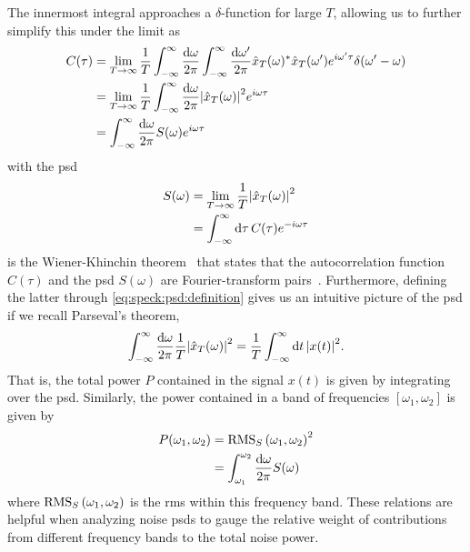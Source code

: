 The innermost integral approaches a $\delta$-function for large $T$,
allowing us to further simplify this under the limit as
\begin{align}
    C(\tau) &= \lim_{T\to\infty} \frac{1}{T}\int_{-\infty}^{\infty}\frac{\dd{\omega}}{2\pi}\int_{-\infty}^{\infty}\frac{\dd{\omega^\prime}}{2\pi}
                \hat{x}_T(\omega)^\ast\hat{x}_T(\omega^\prime)
                e^{i\omega^\prime\tau}\delta(\omega^\prime - \omega)\\
            &= \lim_{T\to\infty}\frac{1}{T}
                \int_{-\infty}^{\infty}\frac{\dd{\omega}}{2\pi}\abs{\hat{x}_T(\omega)}^2 e^{i\omega\tau} \\
            &= \int_{-\infty}^{\infty}\frac{\dd{\omega}}{2\pi} S(\omega) e^{i\omega\tau} \label{eq:speck:wiener_khinchin}
\end{align}
with the \acrfull{psd}
\begin{align}
    S(\omega) &= \lim_{T\to\infty}\frac{1}{T}\abs{\hat{x}_T(\omega)}^2 \label{eq:speck:psd:definition}\\
              &= \int_{-\infty}^{\infty}\dd{\tau} C(\tau)e^{-i\omega\tau}
\end{align}
 is the Wiener-Khinchin theorem~\cite{Wiener1930,Khintchine1934} that states that the autocorrelation function $C(\tau)$ and the \gls{psd} $S(\omega)$ are Fourier-transform pairs~\cite{Koopmans1995}.
Furthermore, defining the latter through \cref{eq:speck:psd:definition} gives us an intuitive picture of the \gls{psd} if we recall Parseval's theorem,
\begin{align}\label{eq:speck:parseval}
    \int_{-\infty}^{\infty}\frac{\dd{\omega}}{2\pi}\frac{1}{T}\abs{\hat{x}_T(\omega)}^2 = \frac{1}{T}\int_{-\infty}^{\infty}\dd{t}\abs{x(t)}^2.
\end{align}
That is, the total power $P$ contained in the signal $x(t)$ is given by integrating over the \gls{psd}.
Similarly, the power contained in a band of frequencies $[\omega_1, \omega_2]$ is given by
\begin{align}
    P(\omega_1, \omega_2) &= \operatorname{RMS}_S\left(\omega_1, \omega_2\right)^2 \label{eq:speck:psd:bandpower}\\
                          &= \int_{\omega_1}^{\omega_2}\frac{\dd{\omega}}{2\pi} S(\omega)
\end{align}
where $\operatorname{RMS}_S\left(\omega_1, \omega_2\right)$ is the \acrlong{rms} within this frequency band.
These relations are helpful when analyzing noise \glspl{psd} to gauge the relative weight of contributions from different frequency bands to the total noise power.

